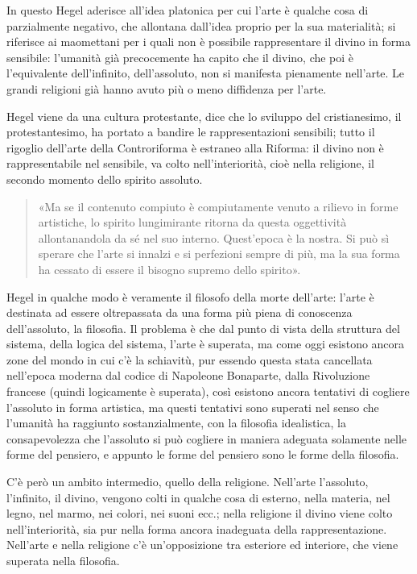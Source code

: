 \documentclass[a4paper,12pt,oneside,openany]{book}%
\begin{document}
In questo Hegel aderisce all’idea platonica per cui l’arte è qualche cosa di parzialmente negativo, che allontana dall’idea proprio per la sua materialità; si riferisce ai maomettani per i quali non è possibile rappresentare il divino in forma sensibile: l’umanità già precocemente ha capito che il divino, che poi è l’equivalente dell’infinito, dell’assoluto, non si manifesta pienamente nell’arte. Le grandi religioni già hanno avuto più o meno diffidenza per l’arte.

Hegel viene da una cultura protestante, dice che lo sviluppo del cristianesimo, il protestantesimo, ha portato a bandire le rappresentazioni sensibili; tutto il rigoglio dell’arte della Controriforma è estraneo alla Riforma: il divino non è rappresentabile nel sensibile, va colto nell’interiorità, cioè nella religione, il secondo momento dello spirito assoluto.

\begin{quotation}
	«Ma se il contenuto compiuto è compiutamente venuto a rilievo in forme artistiche, lo spirito lungimirante ritorna da questa oggettività allontanandola da sé nel suo interno. Quest’epoca è la nostra. Si può sì sperare che l’arte si innalzi e si perfezioni sempre di più, ma la sua forma ha cessato di essere il bisogno supremo dello spirito».
\end{quotation}

Hegel in qualche modo è veramente il filosofo della morte dell’arte: l’arte è destinata ad essere oltrepassata da una forma più piena di conoscenza dell’assoluto, la filosofia. Il problema è che dal punto di vista della struttura del sistema, della logica del sistema, l’arte è superata, ma come oggi esistono ancora zone del mondo in cui c’è la schiavitù, pur essendo questa stata cancellata nell’epoca moderna dal codice di Napoleone Bonaparte, dalla Rivoluzione francese (quindi logicamente è superata), così esistono ancora tentativi di cogliere l’assoluto in forma artistica, ma questi tentativi sono superati nel senso che l’umanità ha raggiunto sostanzialmente, con la filosofia idealistica, la consapevolezza che l’assoluto si può cogliere in maniera adeguata solamente nelle forme del pensiero, e appunto le forme del pensiero sono le forme della filosofia.

C’è però un ambito intermedio, quello della religione.
Nell’arte l’assoluto, l’infinito, il divino, vengono colti in qualche cosa di esterno, nella materia, nel legno, nel marmo, nei colori, nei suoni ecc.; nella religione il divino viene colto nell’interiorità, sia pur nella forma ancora inadeguata della rappresentazione. Nell’arte e nella religione c’è un’opposizione tra esteriore ed interiore, che viene superata nella filosofia.
\end{document}
